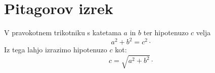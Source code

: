\documentclass{article}
\begin{document}
\section*{Pitagorov izrek}
V pravokotnem trikotniku s katetama \(a\) in \(b\) ter hipotenuzo \(c\) velja
\[ a^2 + b^2 = c^2 \cdot\]
Iz tega lahjo izrazimo hipotenuzo \(c\) kot:
\[c = \sqrt{a^2 + b^2}\cdot\]
\end{document}
